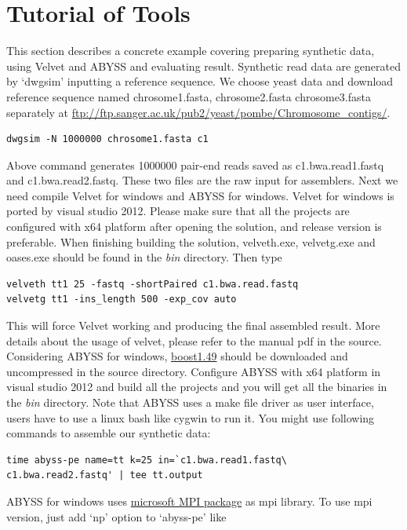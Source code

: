 \documentclass{article}
\begin{document}
\section{Tutorial of Tools}
This section describes a concrete example covering preparing synthetic data, using Velvet and ABYSS and evaluating result. Synthetic read data are generated by `dwgsim' inputting a reference sequence. We choose yeast data and download reference sequence named chrosome1.fasta, chrosome2.fasta chrosome3.fasta separately at \href{ftp://ftp.sanger.ac.uk/pub2/yeast/pombe/Chromosome\_contigs/}{ftp://ftp.sanger.ac.uk/pub2/yeast/pombe/Chromosome\_contigs/}.
\begin{lstlisting}
dwgsim -N 1000000 chrosome1.fasta c1
\end{lstlisting}
Above command generates 1000000 pair-end reads saved as c1.bwa.read1.fastq and c1.bwa.read2.fastq. These two files are the raw input for assemblers. Next we need compile Velvet for windows and ABYSS for windows. Velvet for windows is ported by visual studio 2012. Please make sure that all the projects are configured with x64 platform after opening the solution, and release version is preferable. When finishing building the solution, velveth.exe, velvetg.exe and oases.exe should be found in the \emph{bin} directory. Then type
\begin{lstlisting}
velveth tt1 25 -fastq -shortPaired c1.bwa.read.fastq
velvetg tt1 -ins_length 500 -exp_cov auto
\end{lstlisting}
This will force Velvet working and producing the final assembled result. More details about the usage of velvet, please refer to the manual pdf in the source.\\
Considering ABYSS for windows, \href{http://downloads.sourceforge.net/project/boost/boost/1.49.0/boost_1_49_0.tar.bz2}{boost1.49} should be downloaded and uncompressed in the source directory. Configure ABYSS with x64 platform in visual studio 2012 and build all the projects and you will get all the binaries in the \emph{bin} directory. Note that ABYSS uses a make file driver as user interface, users have to use a linux bash like cygwin to run it. You might use following commands to assemble our synthetic data:
\begin{lstlisting}
time abyss-pe name=tt k=25 in=`c1.bwa.read1.fastq\
c1.bwa.read2.fastq' | tee tt.output
\end{lstlisting}
ABYSS for windows uses \href{http://www.microsoft.com/zh-cn/download/details.aspx?id=14737}{microsoft MPI package} as mpi library. To use mpi version, just add `np' option to `abyss-pe' like
\end{document}
